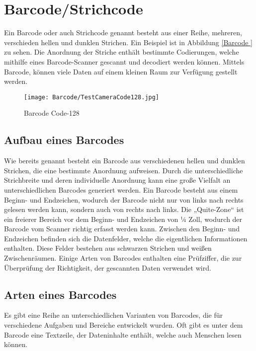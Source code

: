 \section{Barcode/Strichcode}

{Ein Barcode oder auch Strichcode genannt besteht aus einer Reihe, mehreren, verschieden hellen und dunklen Strichen. Ein Beispiel ist in Abbildung \ref{Barcode  } zu sehen. Die Anordnung der Striche enthält bestimmte Codierungen, welche mithilfe eines Barcode-Scanner gescannt und decodiert werden können. Mittels Barcode, können viele Daten auf einem kleinen Raum zur Verfügung gestellt werden. 
}

\begin{figure}
    \centering
    \texttt{[image: Barcode/TestCameraCode128.jpg]}
    \caption{Barcode Code-128 }
    \label{Barcode}
\end{figure}


\subsection{Aufbau eines Barcodes}

Wie bereits genannt besteht ein Barcode aus verschiedenen hellen und dunklen Strichen, die eine bestimmte Anordnung aufweisen. Durch die unterschiedliche Strichbreite und deren individuelle Anordnung kann eine große Vielfalt an unterschiedlichen Barcodes generiert werden.
    Ein Barcode besteht aus einem Beginn- und Endzeichen, wodurch der Barcode nicht nur von links nach rechts gelesen werden kann, sondern auch von rechts nach links.
    Die „Quite-Zone“ ist ein freierer Bereich vor dem Beginn- und Endzeichen von ¼ Zoll, wodurch der Barcode vom Scanner richtig erfasst werden kann. Zwischen den Beginn- und Endzeichen befinden sich die Datenfelder, welche die eigentlichen Informationen enthalten. Diese Felder bestehen aus schwarzen Strichen und weißen Zwischenräumen. Einige Arten von Barcodes enthalten eine Prüfziffer, die zur Überprüfung der Richtigkeit, der gescannten Daten verwendet wird. \cite{Hompel:2007} 


\subsection{Arten eines Barcodes}

{Es gibt eine Reihe an unterschiedlichen Varianten von Barcodes, die für verschiedene Aufgaben und Bereiche entwickelt wurden.
    Oft gibt es unter dem Barcode eine Textzeile, der Dateninhalte enthält, welche auch Menschen lesen können. }


